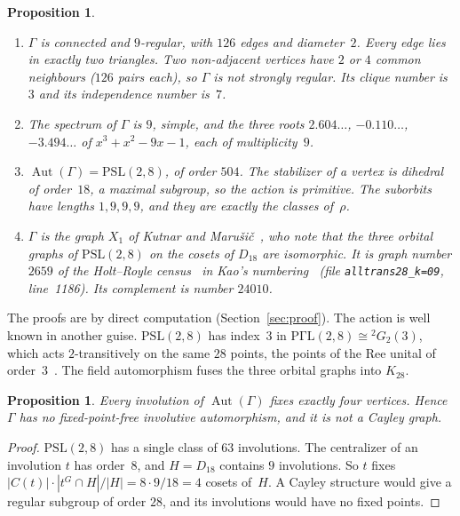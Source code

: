\documentclass[11pt,a4paper]{article}
\newtheorem{proposition}[theorem]{Proposition}
\theoremstyle{definition}
\newcommand{\Aut}{\operatorname{Aut}}
\newcommand{\PSL}{\mathrm{PSL}}
\begin{document}
\begin{proposition}\label{prop:props}
\leavevmode
\begin{enumerate}\itemsep0pt
\item $\Gamma$ is connected and $9$-regular, with $126$ edges and diameter~$2$.
  Every edge lies in exactly two triangles. Two non-adjacent vertices have $2$
  or $4$ common neighbours ($126$ pairs each), so $\Gamma$ is not strongly
  regular. Its clique number is~$3$ and its independence number is~$7$.
\item The spectrum of $\Gamma$ is $9$, simple, and the three roots
  $2.604\ldots$, $-0.110\ldots$, $-3.494\ldots$ of $x^3+x^2-9x-1$, each of
  multiplicity~$9$.
\item $\Aut(\Gamma)=\PSL(2,8)$, of order $504$. The stabilizer of a vertex is
  dihedral of order~$18$, a maximal subgroup, so the action is primitive. The suborbits have lengths
  $1,9,9,9$, and they are exactly the classes of~$\rho$.
\item $\Gamma$ is the graph $X_1$ of Kutnar and Marušič~\cite[Table~2,
  Fig.~8]{KM}, who note that the three orbital graphs of $\PSL(2,8)$ on the
  cosets of $D_{18}$ are isomorphic. It is graph number $2659$ of the Holt--Royle
  census~\cite{HR} in Kao's numbering~\cite{K} (file
  \texttt{alltrans28\_k=09}, line~1186). Its complement is number $24010$.
\end{enumerate}
\end{proposition}

The proofs are by direct computation (Section~\ref{sec:proof}). The action is
well known in another guise. $\PSL(2,8)$ has index~$3$ in
$\mathrm{P\Gamma L}(2,8)\cong{}^2G_2(3)$, which acts $2$-transitively on the
same $28$ points, the points of the Ree unital of order~$3$~\cite{Lu}. The
field automorphism fuses the three orbital graphs into $K_{28}$.

\begin{proposition}\label{prop:invol}
Every involution of $\Aut(\Gamma)$ fixes exactly four vertices. Hence $\Gamma$
has no fixed-point-free involutive automorphism, and it is not a Cayley graph.
\end{proposition}

\begin{proof}
$\PSL(2,8)$ has a single class of $63$ involutions. The centralizer of an
involution $t$ has order~$8$, and $H=D_{18}$ contains $9$ involutions. So $t$
fixes $|C(t)|\cdot|t^G\cap H|/|H|=8\cdot9/18=4$ cosets of~$H$. A Cayley
structure would give a regular subgroup of order $28$, and its involutions
would have no fixed points.
\end{proof}
\end{document}
